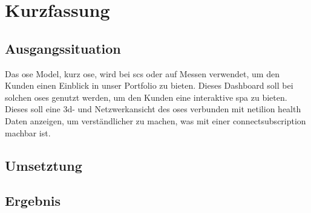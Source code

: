 \chapter*{Kurzfassung}

\section*{Ausgangssituation}

Das \acl{ose} Model, kurz \acs{ose}, wird bei \acfp{sc} oder auf Messen verwendet, um den Kunden einen Einblick in unser Portfolio zu bieten. Dieses Dashboard soll bei solchen \acsp{ose} genutzt werden, um den Kunden eine interaktive \acs{spa} zu bieten. Dieses soll eine 3d- und Netzwerkansicht des \acsp{ose} verbunden mit \acs{netilion} \acs{health} Daten anzeigen, um verständlicher zu machen, was mit einer \acs{connectsubscription} machbar ist.

\section*{Umsetztung}

\lipsum[2-4][12-18]

\section*{Ergebnis}

\lipsum[2-4][12-18]
